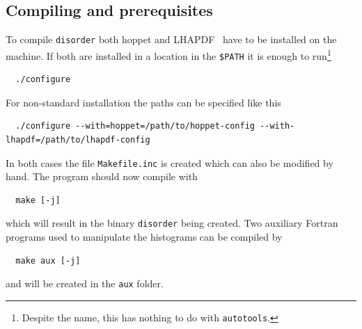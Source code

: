 \documentclass[submission, PhysCodeb]{SciPost}
\newcommand{\hoppet}{{\sc hoppet}}
\newcommand{\disorder}{{\tt disorder}}
\begin{document}
\subsection{Compiling and prerequisites}
To compile \disorder{} both \hoppet{} and
LHAPDF~\cite{Buckley:2014ana} have to be installed on the machine. If
both are installed in a location in the {\tt \$PATH} it is enough to
run\footnote{Despite the name, this has nothing to do with {\tt autotools}.}
\begin{lstlisting}
  ./configure
\end{lstlisting}
For non-standard installation the paths can be specified like this
\begin{lstlisting}
  ./configure --with=hoppet=/path/to/hoppet-config --with-lhapdf=/path/to/lhapdf-config
\end{lstlisting}
In both cases the file {\tt Makefile.inc} is created which can also be
modified by hand. The program should now compile with
\begin{lstlisting}
  make [-j]
\end{lstlisting}
which will result in the binary {\tt disorder} being created. Two
auxiliary Fortran programs used to manipulate the histograms can be
compiled by
\begin{lstlisting}
  make aux [-j]
\end{lstlisting}
and will be created in the {\tt aux} folder. 
\end{document}
